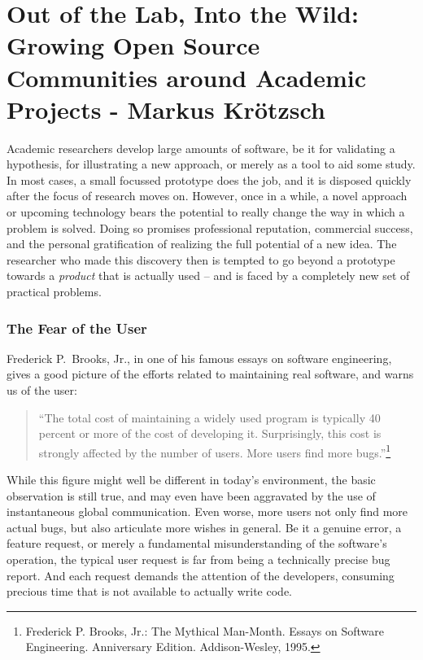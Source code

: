 \chapter{Out of the Lab, Into the Wild: Growing Open Source Communities around Academic Projects - Markus Kr\"{o}tzsch}
Academic researchers develop large amounts of software, be it for validating a hypothesis, for illustrating a new approach, or merely as a tool to aid some study. In most cases, a small focussed prototype does the job, and it is disposed quickly after the focus of research moves on. However, once in a while, a novel approach or upcoming technology bears the potential to really change the way in which a problem is solved. Doing so promises professional reputation, commercial success, and the personal gratification of realizing the full potential of a new idea. The researcher who made this discovery then is tempted to go beyond a prototype towards a \emph{product} that is actually used -- and is faced by a completely new set of practical problems.

\subsection*{The Fear of the User}

Frederick P.\ Brooks, Jr., in one of his famous essays on software engineering, gives a good picture of the efforts related to maintaining real software, and warns us of the user:
%
\begin{quote}
``The total cost of maintaining a widely used program is typically 40 percent or more of the cost of developing it. Surprisingly, this cost is strongly affected by the number of users. More users find more bugs.''\footnote{Frederick P. Brooks, Jr.: The Mythical Man-Month. Essays on Software Engineering. Anniversary Edition. Addison-Wesley, 1995.}
\end{quote}
%
While this figure might well be different in today's environment, the basic observation is still true, and may even have been aggravated by the use of instantaneous global communication. Even worse, more users not only find more actual bugs, but also articulate more wishes in general. Be it a genuine error, a feature request, or merely a fundamental misunderstanding of the software's operation, the typical user request is far from being a technically precise bug report. And each request demands the attention of the developers, consuming precious time that is not available to actually write code.

